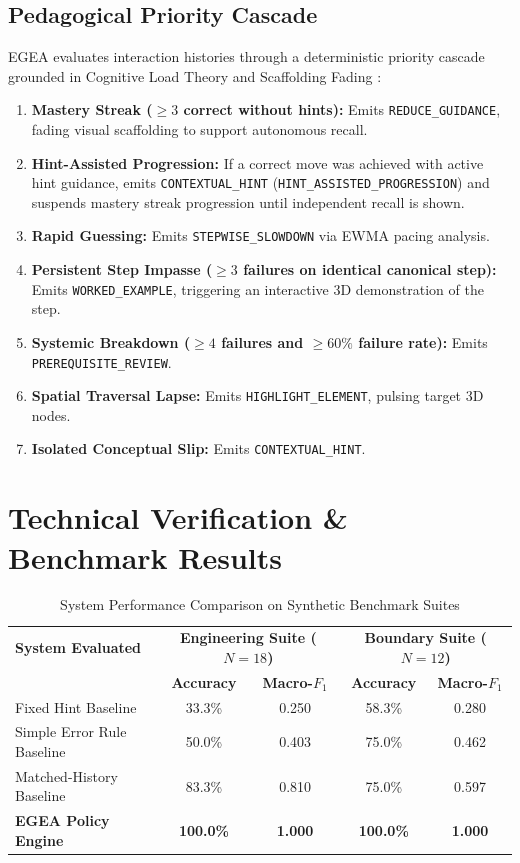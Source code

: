 \documentclass[conference]{IEEEtran}
\begin{document}
\subsection{Pedagogical Priority Cascade}
EGEA evaluates interaction histories through a deterministic priority cascade grounded in Cognitive Load Theory \cite{sweller2011cognitive} and Scaffolding Fading \cite{koedinger2012knowledge}:
\begin{enumerate}
    \item \textbf{Mastery Streak ($\ge 3$ correct without hints):} Emits \texttt{REDUCE\_GUIDANCE}, fading visual scaffolding to support autonomous recall.
    \item \textbf{Hint-Assisted Progression:} If a correct move was achieved with active hint guidance, emits \texttt{CONTEXTUAL\_HINT} (\texttt{HINT\_ASSISTED\_PROGRESSION}) and suspends mastery streak progression until independent recall is shown.
    \item \textbf{Rapid Guessing:} Emits \texttt{STEPWISE\_SLOWDOWN} via EWMA pacing analysis.
    \item \textbf{Persistent Step Impasse ($\ge 3$ failures on identical canonical step):} Emits \texttt{WORKED\_EXAMPLE}, triggering an interactive 3D demonstration of the step.
    \item \textbf{Systemic Breakdown ($\ge 4$ failures and $\ge 60\%$ failure rate):} Emits \texttt{PREREQUISITE\_REVIEW}.
    \item \textbf{Spatial Traversal Lapse:} Emits \texttt{HIGHLIGHT\_ELEMENT}, pulsing target 3D nodes.
    \item \textbf{Isolated Conceptual Slip:} Emits \texttt{CONTEXTUAL\_HINT}.
\end{enumerate}

\section{Technical Verification \& Benchmark Results}

\begin{table}[t]
\caption{System Performance Comparison on Synthetic Benchmark Suites}
\label{tab:benchmarks}
\centering
\begin{tabular}{lcccc}
\toprule
\textbf{System Evaluated} & \multicolumn{2}{c}{\textbf{Engineering Suite ($N=18$)}} & \multicolumn{2}{c}{\textbf{Boundary Suite ($N=12$)}} \\
 & \textbf{Accuracy} & \textbf{Macro-$F_1$} & \textbf{Accuracy} & \textbf{Macro-$F_1$} \\
\midrule
Fixed Hint Baseline        & 33.3\% & 0.250 & 58.3\% & 0.280 \\
Simple Error Rule Baseline & 50.0\% & 0.403 & 75.0\% & 0.462 \\
Matched-History Baseline   & 83.3\% & 0.810 & 75.0\% & 0.597 \\
\textbf{EGEA Policy Engine}& \textbf{100.0\%} & \textbf{1.000} & \textbf{100.0\%} & \textbf{1.000} \\
\bottomrule
\end{tabular}
\end{table}
\end{document}
